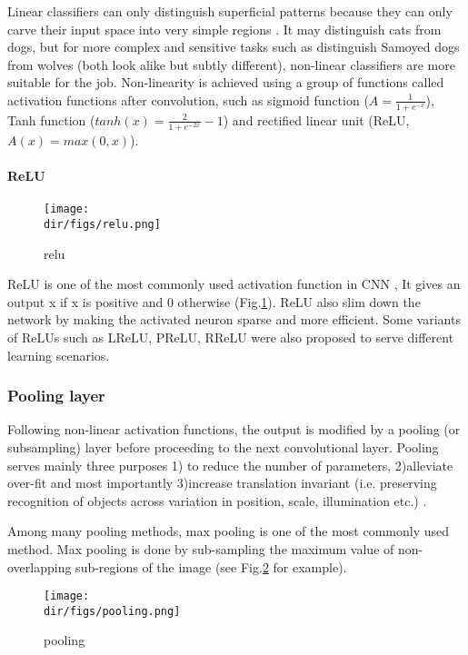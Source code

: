 \label{nonlinearity}
Linear classifiers can only distinguish superficial patterns because they can only carve their input space into very simple regions \citep{lecun2015deep}. It may distinguish cats from dogs, but for more complex and sensitive tasks such as distinguish Samoyed dogs from wolves (both look alike but subtly different), non-linear classifiers are more suitable for the job. 
Non-linearity is achieved using a group of functions called activation functions after convolution, such as sigmoid function ($A=\frac{1}{1+e^{-x}}$), Tanh function ($tanh(x)=\frac{2}{1+e^{-2x}}-1$) and rectified linear unit (ReLU, $A(x) = max(0,x)$).

\paragraph{ReLU}
\begin{figure}[htbp]
  \centering
  \texttt{[image: \\dir/figs/relu.png]}
  \caption{relu}
  \label{relu}
\end{figure}

ReLU is one of the most commonly used activation function in CNN \citep{deng2014deep}, It gives an output x if x is positive and 0 otherwise (Fig.\ref{relu}). ReLU also slim down the network by making the activated neuron sparse and more efficient. Some variants of ReLUs such as LReLU, PReLU, RReLU \citep{xu2015empirical,he2015delving,maas2013rectifier} were also proposed to serve different learning scenarios.

\subsubsection{Pooling layer}
Following non-linear activation functions, the output is modified by a pooling (or subsampling) layer before proceeding to the next convolutional layer. Pooling serves mainly three purposes 1) to reduce the number of parameters, 2)alleviate over-fit and most importantly 3)increase translation invariant (i.e. preserving recognition of objects across variation in position, scale, illumination etc.) \citep{goodfellow2016deep}.

Among many pooling methods, max pooling is one of the most commonly used method. Max pooling is done by sub-sampling the maximum value of non-overlapping sub-regions of the image (see Fig.\ref{pooling} for example).

\begin{figure}[htbp]
  \centering
  \texttt{[image: \\dir/figs/pooling.png]}
  \caption{pooling}
  \label{pooling}
\end{figure}

